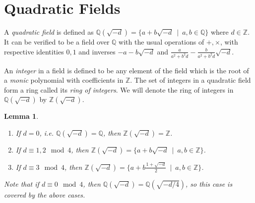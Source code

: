 \documentclass[12pt]{article}
\newcommand{\ints}{{\mathbb{Z}}}
\newcommand{\qf}{{\mathbb{Q}}}
\newtheorem{lemma}[thm]{Lemma}
\begin{document}
\section{Quadratic Fields}

A {\em quadratic field} is defined as $\qf(\sqrt{-d}) = \{a + b\sqrt{-d}\ \mid\ a, b \in \qf\}$ where $d \in \ints$. It can be verified to be a field over $\qf$ with the usual operations of $+, \times$, with respective identities $0, 1$ and inverses $- a - b\sqrt{-d}$ and $\frac{a}{a^2 + b^2 d} - \frac{b}{a^2 + b^2 d}\sqrt{-d}$.

An {\em integer} in a field is defined to be any element of the field which is the root of a {\em monic} polynomial with coefficients in $\ints$.  
The set of integers in a quadratic field form a ring called its {\em ring of integers}.  We will denote the ring of integers in $\qf(\sqrt{-d})$ by $\ints(\sqrt{-d})$. 
\begin{lemma}
\begin{enumerate}
\item If $d = 0$, i.e. $\qf(\sqrt{-d}) = \qf$, then $\ints(\sqrt{-d}) = \ints$.
\item If $d \equiv 1, 2 \mod 4$, then $\ints(\sqrt{-d}) = \{a + b\sqrt{-d}\ \mid\ a, b \in \ints\}$.
\item If $d \equiv 3 \mod 4$, then $\ints(\sqrt{-d}) = \{a + b\frac{1 + \sqrt{-d}}{2}\ \mid\  a, b \in \ints\}$.
\end{enumerate}
Note that if $d \equiv 0 \mod 4$, then $\qf(\sqrt{-d}) = \qf(\sqrt{-d/4})$, so this case is covered by the above cases.
\end{lemma}
\end{document}
